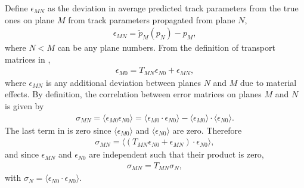 Define $\epsilon_{MN}$ as the deviation in average predicted track parameters from the true ones on plane $M$ from track parameters propagated from plane $N$,
	\begin{align}
		\epsilon_{MN} = \widetilde{p}_{M}(p_{N}) - p_{M}, 
	\end{align}
where $N < M$ can be any plane numbers. From the definition of transport matrices in ,
	\begin{align}
		\epsilon_{M0} = T_{MN} \epsilon_{N0} + \epsilon_{MN},
	\end{align}
where $\epsilon_{MN}$ is any additional deviation between planes $N$ and $M$ due to material effects. By definition, the correlation between error matrices on planes $M$ and $N$ is given by 
	\begin{align} \label{eq:corrTrackMatDefinition}
		\sigma_{MN} = \langle \epsilon_{M0} \epsilon_{N0} \rangle = \langle \epsilon_{M0} \cdot \epsilon_{N0} \rangle - \langle \epsilon_{M0} \rangle \cdot \langle \epsilon_{N0} \rangle.
	\end{align}
The last term in  is zero since $\langle \epsilon_{M0} \rangle$ and $\langle \epsilon_{N0} \rangle$ are zero. Therefore 
	\begin{align}
		\sigma_{MN} = \langle ( T_{MN} \epsilon_{N0} + \epsilon_{MN}) \cdot \epsilon_{N0} \rangle,
	\end{align}
and since $\epsilon_{MN}$ and $\epsilon_{N0}$ are independent such that their product is zero,
	\begin{align}
		\sigma_{MN} = T_{MN} \sigma_{N},
	\end{align}
with $\sigma_{N} = \langle \epsilon_{N0} \cdot \epsilon_{N0} \rangle$.




